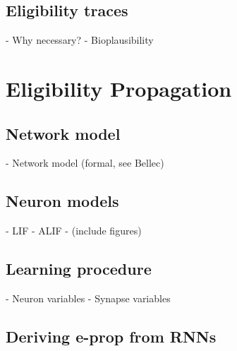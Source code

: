     \subsection{Eligibility traces}
        \begin{tcolorbox}[colback=orange]
        - Why necessary?
        - Bioplausibility

        \vspace{12cm}

        \end{tcolorbox}

\section{Eligibility Propagation}

    \subsection{Network model}
        \begin{tcolorbox}[colback=orange]
        - Network model (formal, see Bellec)

        \vspace{14cm}

        \end{tcolorbox}

    \subsection{Neuron models}
        \begin{tcolorbox}[colback=orange]
        - LIF
        - ALIF
        - (include figures)
        \vspace{18cm}

        \end{tcolorbox}

    \subsection{Learning procedure}

        \begin{tcolorbox}[colback=orange]
        - Neuron variables
        - Synapse variables

        \vspace{20cm}

        \end{tcolorbox}

    \subsection{Deriving e-prop from RNNs}

